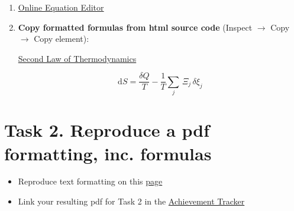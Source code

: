 \documentclass[a4paper,11pt,leqno]{article}
\begin{document}
\begin{enumerate}
	\item \href{https://latexeditor.lagrida.com/}{Online Equation Editor} 
	\item \textbf{{\color{red}Copy formatted formulas from html source code}} (Inspect $\rightarrow$ Copy $\rightarrow$ Copy element):
	
	\href{https://en.wikipedia.org/wiki/Second_law_of_thermodynamics}{Second Law of Thermodynamics}
	
	\[\mathrm {d} S={\frac {\delta Q}{T}}-{\frac {1}{T}}\sum _{j}\,\Xi _{j}\,\delta \xi _{j}\]
\end{enumerate}

\section*{Task 2. Reproduce a pdf formatting, inc. formulas}
\label{task}

\begin{tcolorbox}[width=\textwidth, colback={yellow!40!white}, title={}, colbacktitle=yellow!60!white, coltitle=black]
	\begin{itemize}
		\item Reproduce text formatting on this \href{https://github.com/kunilovskaya/dskills_workshop/blob/main/w1_latex_basics/s2/practice2.pdf}{page}
		\item Link your resulting pdf for Task 2 in the \href{https://docs.google.com/document/d/17ZBAQGBKIlO6JMwxz3LlghYq1sdsUjhHVXga46BK0kg/edit?usp=sharing}{Achievement Tracker}
	\end{itemize}
	
\end{tcolorbox}%
\end{document}
